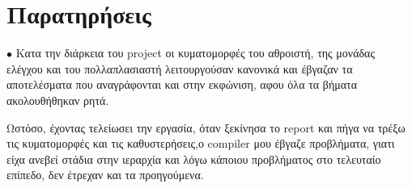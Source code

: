 \documentclass{article}
\begin{document}
\clearpage


\section{Παρατηρήσεις}

$\bullet$ Κατα την διάρκεια του \foreignlanguage{english}{project} οι κυματομορφές του αθροιστή, της μονάδας ελέγχου και του πολλαπλασιαστή λειτουργούσαν κανονικά και έβγαζαν τα αποτελέσματα που αναγράφονται και στην εκφώνιση, αφου όλα τα βήματα ακολουθήθηκαν ρητά.

Ωστόσο, έχοντας τελείωσει την εργασία, όταν ξεκίνησα το \foreignlanguage{english}{report} και πήγα να τρέξω τις κυματομορφές και τις καθυστερήσεις,ο \foreignlanguage{english}{compiler} μου έβγαζε προβλήματα, γιατι είχα ανεβεί στάδια στην ιεραρχία και λόγω κάποιου προβλήματος στο τελευταίο επίπεδο, δεν έτρεχαν και τα προηγούμενα.
\end{document}
